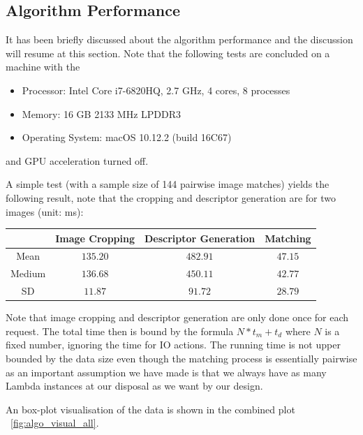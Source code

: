 \subsection{Algorithm Performance}
\label{sec:algorithm}

It has been briefly discussed about the algorithm performance and the discussion will resume at this section. Note that the following tests are concluded on a machine with the 

\begin{itemize}
	\item Processor: Intel Core i7-6820HQ, 2.7 GHz, 4 cores, 8 processes
	\item Memory: 16 GB 2133 MHz LPDDR3
	\item Operating System: macOS 10.12.2 (build 16C67)
\end{itemize}

and GPU acceleration turned off.

A simple test (with a sample size of 144 pairwise image matches) yields the following result, note that the cropping and descriptor generation are for two images (unit: ms):

\begin{center}
\begin{tabular}{c|c c c}
        & Image Cropping & Descriptor Generation & Matching \\
\hline
Mean    & $135.20$       & $482.91$              & $47.15$  \\
Medium  & $136.68$       & $450.11$              & $42.77$  \\
SD      & $11.87$        & $91.72$               & $28.79$
\end{tabular}
\end{center}

Note that image cropping and descriptor generation are only done once for each request. The total time then is bound by the formula $N * t_m + t_d$ where $N$ is a fixed number, ignoring the time for IO actions. The running time is not upper bounded by the data size even though the matching process is essentially pairwise as an important assumption we have made is that we always have as many Lambda instances at our disposal as we want by our design.

An box-plot visualisation of the data is shown in the combined plot ~\ref{fig:algo_visual_all}.

